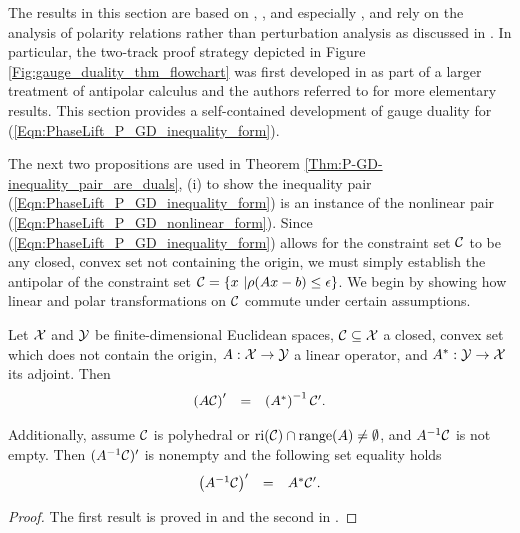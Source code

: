 The results in this section are based on \cite{rockafellar1970convex}, \cite{DBLP:journals/mp/Freund87}, and especially \cite{DBLP:journals/siamjo/FriedlanderMP14}, and rely on the analysis of polarity relations rather than perturbation analysis as discussed in \cite{aravkin2017foundations}.    
In particular, the two-track proof strategy depicted in Figure \ref{Fig:gauge_duality_thm_flowchart} was first developed in \cite{DBLP:journals/siamjo/FriedlanderMP14} as part of a larger treatment of antipolar calculus and the authors referred to \cite{rockafellar1970convex} for more elementary results. 
This section provides a self-contained development of gauge duality for (\ref{Eqn:PhaseLift_P_GD_inequality_form}).





The next two propositions are used in Theorem \ref{Thm:P-GD-inequality_pair_are_duals}, (i) to show the inequality pair (\ref{Eqn:PhaseLift_P_GD_inequality_form}) is an instance of the nonlinear pair (\ref{Eqn:PhaseLift_P_GD_nonlinear_form}).  Since (\ref{Eqn:PhaseLift_P_GD_inequality_form}) allows for the constraint set ${\mathcal C}$ to be any closed, convex set not containing the origin, we must simply establish the antipolar of the constraint set ${\mathcal C} = \{ x \ | \rho(Ax-b) \leq \epsilon\}$.  We begin by showing how linear and polar transformations on ${\mathcal C}$ commute under certain assumptions.





\begin{prop}		\label{Prop:antipolar_set_equalities}
Let ${\mathcal X}$ and ${\mathcal Y}$ be finite-dimensional Euclidean spaces, ${\mathcal C} \subseteq {\mathcal X}$ a closed, convex set which does not contain the origin, $A : {\mathcal X} \rightarrow {\mathcal Y}$ a linear operator, and $A^* : {\mathcal Y} \rightarrow {\mathcal X}$ its adjoint.
Then
\begin{equation}		\label{Eqn:antipolar_set_equalities_1}
\begin{array}{rll}
\left( A {\mathcal C} \right)' & = & 	\left( A^* \right)^{-1} {\mathcal C}' .
\end{array}
\end{equation}

Additionally, assume ${\mathcal C}$ is polyhedral or $\textnormal{ri}({\mathcal C}) \cap \textnormal{range}(A) \neq \emptyset$, and $A^{-1}{\mathcal C}$ is not empty.  
Then $( A^{-1} {\mathcal C})'$ is nonempty and the following set equality holds
\begin{equation}		\label{Eqn:antipolar_set_equalities_2}
\begin{array}{rll}
\left( A^{-1} {\mathcal C} \right)' & = &  A^* {\mathcal C}' .
\end{array}
\end{equation}
\end{prop}
\begin{proof}
The first result is proved in \cite[Proposition 3.3]{DBLP:journals/siamjo/FriedlanderMP14} and the second in \cite[Proposition 3.4, 3.5]{DBLP:journals/siamjo/FriedlanderMP14}.
\end{proof}


